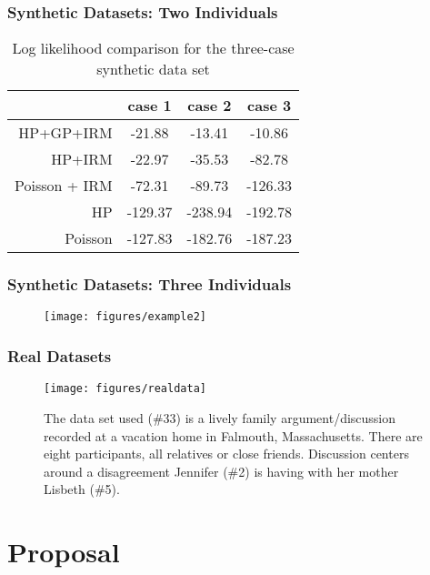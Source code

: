 \documentclass{beamer}
\begin{document}
\begin{frame}
\frametitle{Synthetic Datasets: Two Individuals}
\begin{table}[ht]
\caption{Log likelihood comparison for the three-case synthetic data set}
\begin{center}
\begin{small}
\begin{sc}
\begin{tabular}{|r|c|c|c|}
\hline
  & case 1  & case 2 & case 3\\
\hline
HP+GP+IRM & -21.88 & -13.41 & -10.86\\
\hline
HP+IRM & -22.97 & -35.53 & -82.78\\
\hline
Poisson + IRM & -72.31  & -89.73 & -126.33\\
\hline
HP & -129.37  & -238.94 & -192.78\\
\hline
Poisson & -127.83  & -182.76 & -187.23\\
\hline
\end{tabular}\label{synthetic training log  likelihood}
\end{sc}
\end{small}
\end{center}
\end{table}
\end{frame}


\begin{frame}
\frametitle{Synthetic Datasets: Three Individuals}
\begin{figure}
  \centering  
	\texttt{[image: figures/example2]}
  \label{fi: example 1}
\end{figure}
\end{frame}


\begin{frame}
\frametitle{Real Datasets}
\begin{figure}
  \centering  
	\texttt{[image: figures/realdata]}
  \caption{The data set used (\#33) is a lively family argument/discussion recorded at a vacation home in Falmouth, Massachusetts. There are eight participants, all relatives or close friends. Discussion centers around a disagreement Jennifer (\#2) is having with her mother Lisbeth (\#5).}
\end{figure}
\end{frame}


\section{Proposal}
\end{document}
